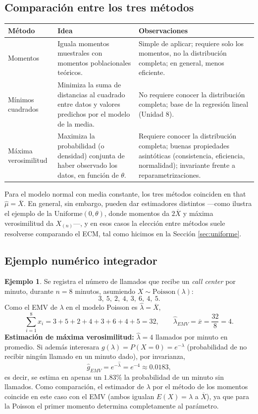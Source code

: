 \documentclass[11pt,a4paper]{article}
\theoremstyle{plain}
\theoremstyle{definition}
\newtheorem{ejemplo}[teorema]{Ejemplo}
\theoremstyle{remark}
\begin{document}
\subsection{Comparación entre los tres métodos}

\begin{center}
\small
\begin{tabular}{p{3cm}p{5.3cm}p{5.3cm}}
\toprule
\textbf{Método} & \textbf{Idea} & \textbf{Observaciones} \\
\midrule
Momentos & Iguala momentos muestrales con momentos poblacionales teóricos. & Simple de aplicar; requiere solo los momentos, no la distribución completa; en general, menos eficiente. \\
Mínimos cuadrados & Minimiza la suma de distancias al cuadrado entre datos y valores predichos por el modelo de la media. & No requiere conocer la distribución completa; base de la regresión lineal (Unidad 8). \\
Máxima verosimilitud & Maximiza la probabilidad (o densidad) conjunta de haber observado los datos, en función de $\theta$. & Requiere conocer la distribución completa; buenas propiedades asintóticas (consistencia, eficiencia, normalidad); invariante frente a reparametrizaciones. \\
\bottomrule
\end{tabular}
\end{center}

Para el modelo normal con media constante, los tres métodos coinciden en that $\widehat\mu = \overline X$. En general, sin embargo, pueden dar estimadores distintos —como ilustra el ejemplo de la $\text{Uniforme}(0,\theta)$, donde momentos da $2\overline X$ y máxima verosimilitud da $X_{(n)}$—, y en esos casos la elección entre métodos suele resolverse comparando el ECM, tal como hicimos en la Sección \ref{sec:uniforme}.

\subsection{Ejemplo numérico integrador}

\begin{ejemplo}
Se registra el número de llamados que recibe un \emph{call center} por minuto, durante $n=8$ minutos, asumiendo $X\sim\text{Poisson}(\lambda)$:
\[
3,\ 5,\ 2,\ 4,\ 3,\ 6,\ 4,\ 5.
\]
Como el EMV de $\lambda$ en el modelo Poisson es $\widehat\lambda=\overline X$,
\[
\sum_{i=1}^8 x_i = 3+5+2+4+3+6+4+5 = 32, \qquad \widehat\lambda_{EMV} = \overline x = \frac{32}{8}=4.
\]
\textbf{Estimación de máxima verosimilitud:} $\widehat\lambda=4$ llamados por minuto en promedio. Si además interesara $g(\lambda)=P(X=0)=e^{-\lambda}$ (probabilidad de no recibir ningún llamado en un minuto dado), por invarianza,
\[
\widehat g_{EMV} = e^{-\widehat\lambda} = e^{-4}\approx 0.0183,
\]
es decir, se estima en apenas un $1.83\%$ la probabilidad de un minuto sin llamados. Como comparación, el estimador de $\lambda$ por el método de los momentos coincide en este caso con el EMV (ambos igualan $E(X)=\lambda$ a $\overline X$), ya que para la Poisson el primer momento determina completamente al parámetro.
\end{ejemplo}
\end{document}
